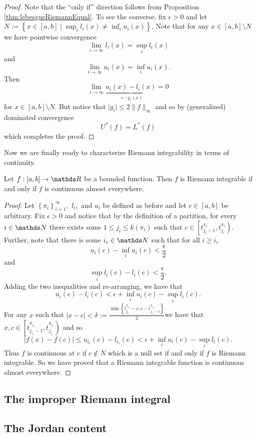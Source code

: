 \begin{proof}
Note that the ``only if'' direction follows from Proposition \ref{thm:lebesgueRiemannEqual}.
To see the converse, fix $\epsilon>0$ and let $N:=\left\{ x\in\left[a,b\right]\mid\sup_{i}l_{i}\left(x\right)\neq\inf_{i}u_{i}\left(x\right)\right\} $.
Note that for any $x\in[a,b]\setminus N$ we have pointwise convergence
\[
\lim_{i\to\infty}l_{i}\left(x\right)=\sup_{i}l_{i}\left(x\right)
\]
and
\[
\lim_{i\to\infty}u_{i}\left(x\right)=\inf_{i}u_{i}\left(x\right).
\]
Then 
\[
\lim_{i\to\infty}\underbrace{u_{i}\left(x\right)-l_{i}\left(x\right)}_{=:g_{i}\left(x\right)}=0
\]
for $x\in\left[a,b\right]\setminus N$. But notice that $\lvert g_{i}\rvert\leq2\lVert f\rVert_{\infty}$
and so by (generalized) dominated convergence
\[
U^{*}\left(f\right)=L^{*}\left(f\right)
\]
which completes the proof.
\end{proof}
Now we are finally ready to characterize Riemann integrability in
terms of continuity.
\begin{thm}
\label{thm:riemannIntegrableAEContinuous}Let $f:\left[a,b\right]\to\R$
be a bounded function. Then $f$ is Riemann integrable if and only
if $f$ is continuous almost everywhere.
\end{thm}

\begin{proof}
Let $\left\{ \pi_{i}\right\} _{i=1}^{\infty},$ $l_{i},$ and $u_{i}$
be defined as before and let $c\in\left[a,b\right]$ be arbitrary.
Fix $\epsilon>0$ and notice that by the definition of a partition,
for every $i\in\N$ there exists some $1\leq j_{i}\leq k\left(\pi_{i}\right)$
such that $c\in\left[t_{j_{i}-1}^{\pi_{i}},t_{j_{i}}^{\pi_{i}}\right)$.
Further, note that there is some $i_{c}\in\N$ such that for all $i\geq i_{c}$
\[
u_{i}\left(c\right)-\inf_{i}u_{i}\left(c\right)<\frac{\epsilon}{2}
\]
and
\[
\sup_{i}l_{i}\left(c\right)-l_{i}\left(c\right)<\frac{\epsilon}{2}.
\]
Adding the two inequalities and re-arranging, we have that 
\[
u_{i}\left(c\right)-l_{i}\left(c\right)<\epsilon+\inf_{i}u_{i}\left(c\right)-\sup_{i}l_{i}\left(c\right).
\]
For any $x$ such that $\lvert x-c\rvert<\delta:=\frac{\min\left\{ t_{j_{i_{c}}}^{\pi_{i_{c}}}-c,c-t_{j_{i_{c}}-1}^{\pi_{i_{c}}}\right\} }{2}$we
have that $x,c\in\left[t_{j_{i_{c}}-1}^{\pi_{i_{c}}},t_{j_{i_{c}}}^{\pi_{i_{c}}}\right)$
and so
\[
\lvert f\left(x\right)-f\left(c\right)\rvert\leq u_{i_{c}}\left(c\right)-l_{i_{c}}\left(c\right)<\epsilon+\inf_{i}u_{i}\left(c\right)-\sup_{i}l_{i}\left(c\right).
\]
Thus $f$ is continuous at $c$ if $c\notin N$ which is a null set
if and only if $f$ is Riemann integrable. So we have proved that
a Riemann integrable function is continuous almost everywhere.

\end{proof}

\subsection{The improper Riemann integral}

\subsection{The Jordan content}

